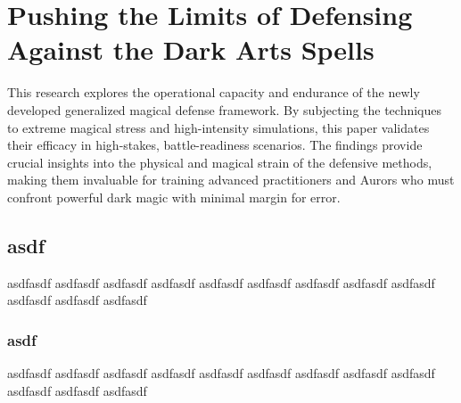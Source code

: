 \chapter{Pushing the Limits of Defensing Against the Dark Arts Spells}
This research explores the operational capacity and endurance of the newly developed generalized magical defense framework. By subjecting the techniques to extreme magical stress and high-intensity simulations, this paper validates their efficacy in high-stakes, battle-readiness scenarios. The findings provide crucial insights into the physical and magical strain of the defensive methods, making them invaluable for training advanced practitioners and Aurors who must confront powerful dark magic with minimal margin for error.~\cite{pushlimits2025magic}

\section{asdf}
asdfasdf asdfasdf asdfasdf asdfasdf asdfasdf asdfasdf asdfasdf asdfasdf asdfasdf asdfasdf asdfasdf asdfasdf


\subsection{asdf}
asdfasdf asdfasdf asdfasdf asdfasdf asdfasdf asdfasdf asdfasdf asdfasdf asdfasdf asdfasdf asdfasdf asdfasdf


